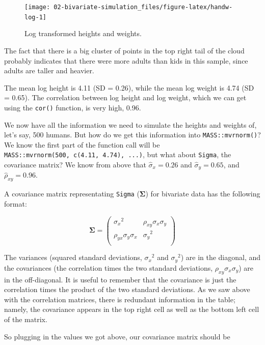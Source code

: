\documentclass[]{book}
\begin{document}
\begin{figure}

{\centering \texttt{[image: 02-bivariate-simulation\_files/figure-latex/handw-log-1]} 

}

\caption{Log transformed heights and weights.}\label{fig:handw-log}
\end{figure}

The fact that there is a big cluster of points in the top right tail of the cloud probably indicates that there were more adults than kids in this sample, since adults are taller and heavier.

The mean log height is 4.11 (SD = 0.26), while the mean log weight is 4.74 (SD = 0.65). The correlation between log height and log weight, which we can get using the \texttt{cor()} function, is very high, 0.96.

We now have all the information we need to simulate the heights and weights of, let's say, 500 humans. But how do we get this information into \texttt{MASS::mvrnorm()}? We know the first part of the function call will be \texttt{MASS::mvrnorm(500,\ c(4.11,\ 4.74),\ ...)}, but what about \texttt{Sigma}, the covariance matrix? We know from above that \(\hat{\sigma}_x = 0.26\) and \(\hat{\sigma}_y = 0.65\), and \(\hat{\rho}_{xy} = 0.96\).

A covariance matrix representating \texttt{Sigma} (\(\mathbf{\Sigma}\)) for bivariate data has the following format:

\[
\mathbf{\Sigma} =
\begin{pmatrix}
{\sigma_x}^2                & \rho_{xy} \sigma_x \sigma_y \\
\rho_{yx} \sigma_y \sigma_x & {\sigma_y}^2 \\
\end{pmatrix}
\]

The variances (squared standard deviations, \({\sigma_x}^2\) and \({\sigma_y}^2\)) are in the diagonal, and the covariances (the correlation times the two standard deviations, \(\rho_{xy} \sigma_x \sigma_y\)) are in the off-diagonal. It is useful to remember that the covariance is just the correlation times the product of the two standard deviations. As we saw above with the correlation matrices, there is redundant information in the table; namely, the covariance appears in the top right cell as well as the bottom left cell of the matrix.

So plugging in the values we got above, our covariance matrix should be
\end{document}
